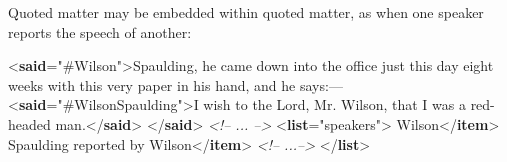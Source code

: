 Quoted matter may be embedded within quoted matter, as when one speaker reports the speech of another: \par\bgroup{}\exampleFont \begin{shaded}\noindent\mbox{}{<\textbf{said}\hspace*{1em}{who}="{\#Wilson}">}Spaulding, he came down into the office just this day\mbox{}\newline 
 eight weeks with this very paper in his hand, and he says:—\mbox{}\newline 
{<\textbf{said}\hspace*{1em}{who}="{\#WilsonSpaulding}">}I wish to the Lord, Mr. Wilson, that I was a\mbox{}\newline 
\hspace*{1em}\hspace*{1em} red-headed man.{</\textbf{said}>}\mbox{}\newline 
{</\textbf{said}>}\mbox{}\newline 
\textit{<!-- ... -->}\mbox{}\newline 
{<\textbf{list}\hspace*{1em}{type}="{speakers}">}\mbox{}\newline 
{}Wilson{</\textbf{item}>}\mbox{}\newline 
{}Spaulding reported by Wilson{</\textbf{item}>}\mbox{}\newline 
\textit{<!-- ...-->}\mbox{}\newline 
{</\textbf{list}>}\end{shaded}\egroup\par \par
